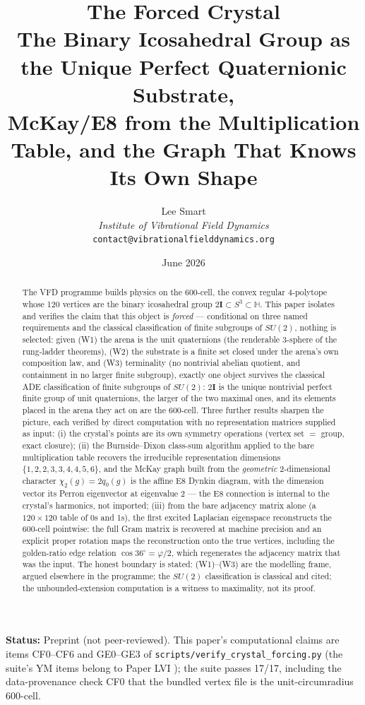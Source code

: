 \documentclass[12pt]{article}
\title{The Forced Crystal\\[6pt]
\large The Binary Icosahedral Group as the Unique Perfect Quaternionic Substrate,\\
McKay/E8 from the Multiplication Table, and the Graph That Knows Its Own Shape}
\author{Lee Smart\\ \textit{Institute of Vibrational Field Dynamics}\\ \texttt{contact@vibrationalfielddynamics.org}}
\date{June 2026}
\theoremstyle{definition}
\theoremstyle{remark}
\newcommand{\twoI}{2\mathbf{I}}
\newcommand{\Hq}{\mathbb{H}}
\begin{document}
\maketitle

\noindent\textbf{Status:} Preprint (not peer-reviewed). This paper's computational claims are items CF0--CF6 and GE0--GE3 of \texttt{scripts/verify\_crystal\_forcing.py} (the suite's YM items belong to Paper LVI \citep{SmartLVI}); the suite passes 17/17, including the data-provenance check CF0 that the bundled vertex file is the unit-circumradius 600-cell.

\begin{abstract}
The VFD programme builds physics on the 600-cell, the convex regular 4-polytope whose 120 vertices are the binary icosahedral group $\twoI \subset S^3 \subset \Hq$. This paper isolates and verifies the claim that this object is \emph{forced} --- conditional on three named requirements and the classical classification of finite subgroups of $SU(2)$, nothing is selected: given (W1) the arena is the unit quaternions (the renderable 3-sphere of the rung-ladder theorems), (W2) the substrate is a finite set closed under the arena's own composition law, and (W3) terminality (no nontrivial abelian quotient, and containment in no larger finite subgroup), exactly one object survives the classical ADE classification of finite subgroups of $SU(2)$: $\twoI$ is the unique nontrivial perfect finite group of unit quaternions, the larger of the two maximal ones, and its elements placed in the arena they act on are the 600-cell. Three further results sharpen the picture, each verified by direct computation with no representation matrices supplied as input: (i) the crystal's points are its own symmetry operations (vertex set $=$ group, exact closure); (ii) the Burnside--Dixon class-sum algorithm applied to the bare multiplication table recovers the irreducible representation dimensions $\{1,2,2,3,3,4,4,5,6\}$, and the McKay graph built from the \emph{geometric} 2-dimensional character $\chi_2(g) = 2q_0(g)$ is the affine E8 Dynkin diagram, with the dimension vector its Perron eigenvector at eigenvalue 2 --- the E8 connection is internal to the crystal's harmonics, not imported; (iii) from the bare adjacency matrix alone (a $120\times120$ table of 0s and 1s), the first excited Laplacian eigenspace reconstructs the 600-cell pointwise: the full Gram matrix is recovered at machine precision and an explicit proper rotation maps the reconstruction onto the true vertices, including the golden-ratio edge relation $\cos 36^\circ = \varphi/2$, which regenerates the adjacency matrix that was the input. The honest boundary is stated: (W1)--(W3) are the modelling frame, argued elsewhere in the programme; the $SU(2)$ classification is classical and cited; the unbounded-extension computation is a witness to maximality, not its proof.
\end{abstract}
\end{document}
